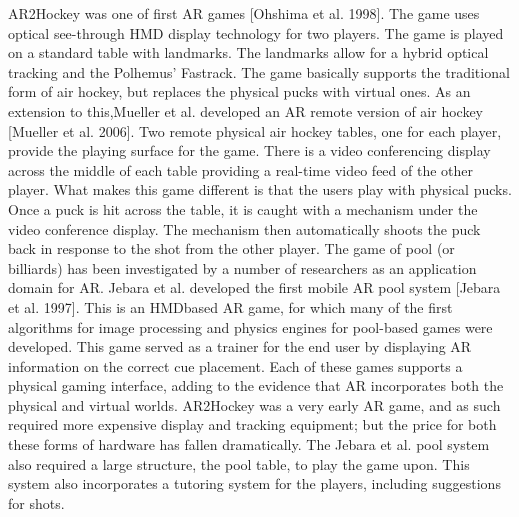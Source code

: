 AR2Hockey was one of first AR games [Ohshima et al. 1998]. The game uses optical see-through HMD display technology for two players. The game is played on a standard table with landmarks. The landmarks allow for a hybrid optical tracking and the Polhemus’ Fastrack. The game basically supports the traditional form of air hockey, but replaces the physical pucks with virtual ones. As an extension to this,Mueller et al. developed an AR remote version of air hockey [Mueller et al. 2006]. Two remote physical air hockey tables, one for each player, provide the playing surface for the game. There is a video conferencing display across the middle of each table providing a real-time video feed of the other player. What makes this game different is that the users play with physical pucks. Once a puck is hit across the table, it is caught with a mechanism under the video conference display. The mechanism then automatically shoots the puck back in response to the shot from the other player. The game of pool (or billiards) has been investigated by a number of researchers as an application domain for AR. Jebara et al. developed the first mobile AR pool system [Jebara et al. 1997]. This is an HMDbased AR game, for which many of the first algorithms for image processing and physics engines for pool-based games were developed. This game served as a trainer for the end user by displaying AR information on the correct cue placement. Each of these games supports a physical gaming interface, adding to the evidence that AR incorporates both the physical and virtual worlds. AR2Hockey was a very early AR game, and as such required more expensive display and tracking equipment; but the price for both these forms of hardware has fallen dramatically. The Jebara et al. pool system also required a large structure, the pool table, to play the game upon. This system also incorporates a tutoring system for the players, including suggestions for shots.

